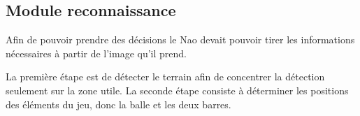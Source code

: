 \subsection{Module reconnaissance}
\label{sub:Module reconnaissance}
\par Afin de pouvoir prendre des décisions le Nao devait pouvoir tirer les informations nécessaires à partir de l'image qu'il prend.
\par La première étape est de détecter le terrain afin de concentrer la détection seulement sur la zone utile. La seconde étape consiste à déterminer les positions des éléments du jeu, donc la balle et les deux barres.
  
  
